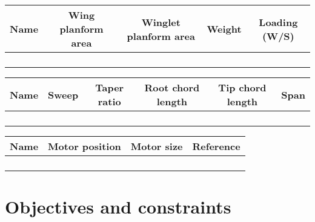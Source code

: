     \begin{table}[H]
        \begin{tabular}{|c|c|c|c|c|} %
            \hline \textbf{Name} & \textbf{Wing planform area} & \textbf{Winglet planform area} & \textbf{Weight} & \textbf{Loading (W/S)} \\ \hline %
             & & & & \\ \hline
             & & & & \\ \hline
             & & & & \\ \hline
             & & & & \\ \hline
        \end{tabular}
    \end{table}
    
    \begin{table}[H]
        \begin{tabular}{|c|c|c|c|c|c| } %
            \hline \textbf{Name} & \textbf{Sweep} & \textbf{Taper ratio} & \textbf{Root chord length} & \textbf{Tip chord length} & \textbf{Span} \\ \hline %
             & & & & & \\ \hline
             & & & & & \\ \hline
             & & & & & \\ \hline
             & & & & & \\ \hline
        \end{tabular}
    \end{table}
    
    \begin{table}[H]
        \begin{tabular}{|c|c|c|c| } %
            \hline \textbf{Name} & \textbf{Motor position} & \textbf{Motor size} & \textbf{Reference} \\ \hline %
             & & & \\ \hline
             & & & \\ \hline
             & & & \\ \hline
             & & & \\ \hline
        \end{tabular}
    \end{table}

\section{Objectives and constraints}

